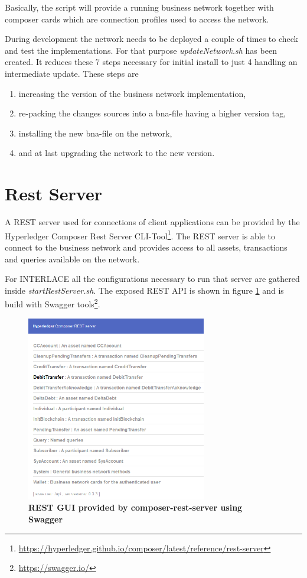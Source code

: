 Basically, the script will provide a running business network together with composer cards which are connection profiles used to access the network.

During development the network needs to be deployed a couple of times to check and test the implementations. For that purpose \textit{updateNetwork.sh} has been created. It reduces these 7 steps necessary for initial install to just 4 handling an intermediate update. These steps are

\begin{enumerate}
	\item increasing the version of the business network implementation,
	\item re-packing the changes sources into a bna-file having a higher version tag,
	\item installing the new bna-file on the network,
	\item and at last upgrading the network to the new version.
\end{enumerate}

\section{Rest Server}
\label{sec:rest-server}

A REST server used for connections of client applications can be provided by the Hyperledger Composer Rest Server CLI-Tool\footnote{\url{https://hyperledger.github.io/composer/latest/reference/rest-server}}. The REST server is able to connect to the business network and provides access to all assets, transactions and queries available on the network.

For INTERLACE all the configurations necessary to run that server are gathered inside \textit{startRestServer.sh}. The exposed REST API is shown in figure \ref{fig:rest-swagger} and is build with Swagger tools\footnote{\url{https://swagger.io/}}.

\begin{figure}[htbp]
  \centering
  \includegraphics[width=0.7\textwidth]{Figures/rest-swagger}
  \caption{\bf\small REST GUI provided by composer-rest-server using Swagger}
  \label{fig:rest-swagger}
\end{figure}

